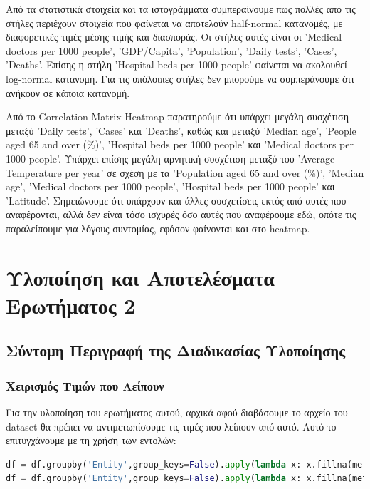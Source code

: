 \documentclass[12pt,a4paper]{article}
\begin{document}
Από τα στατιστικά στοιχεία και τα ιστογράμματα συμπεραίνουμε πως πολλές από τις στήλες περιέχουν στοιχεία που φαίνεται να αποτελούν half-normal κατανομές, με διαφορετικές τιμές μέσης τιμής και διασποράς. Οι στήλες αυτές είναι οι 'Medical doctors per 1000 people', 'GDP/Capita', 'Population', 'Daily tests', 'Cases', 'Deaths'. Επίσης η στήλη 'Hospital beds per 1000 people' φαίνεται να ακολουθεί log-normal κατανομή. Για τις υπόλοιπες στήλες δεν μπορούμε να συμπεράνουμε ότι ανήκουν σε κάποια κατανομή.

Από το Correlation Matrix Heatmap παρατηρούμε ότι υπάρχει μεγάλη συσχέτιση μεταξύ 'Daily tests', 'Cases' και 'Deaths', καθώς και μεταξύ 'Median age', 'People aged 65 and over (\%)', 'Hospital beds per 1000 people' και 'Medical doctors per 1000 people'. Υπάρχει επίσης μεγάλη αρνητική συσχέτιση μεταξύ του 'Average Temperature per year' σε σχέση με τα 'Population aged 65 and over (\%)', 'Median age', 'Medical doctors per 1000 people', 'Hospital beds per 1000 people' και 'Latitude'. Σημειώνουμε ότι υπάρχουν και άλλες συσχετίσεις εκτός από αυτές που αναφέρονται, αλλά δεν είναι τόσο ισχυρές όσο αυτές που αναφέρουμε εδώ, οπότε τις παραλείπουμε για λόγους συντομίας, εφόσον φαίνονται και στο heatmap.

\section{Υλοποίηση και Αποτελέσματα Ερωτήματος 2}

\subsection{Σύντομη Περιγραφή της Διαδικασίας Υλοποίησης}

\subsubsection{Χειρισμός Τιμών που Λείπουν}

Για την υλοποίηση του ερωτήματος αυτού, αρχικά αφού διαβάσουμε το αρχείο του dataset θα πρέπει να αντιμετωπίσουμε τις τιμές που λείπουν από αυτό. Αυτό το επιτυγχάνουμε με τη χρήση των εντολών:

\begin{lstlisting}[language=Python]
df = df.groupby('Entity',group_keys=False).apply(lambda x: x.fillna(method='ffill'))
df = df.groupby('Entity',group_keys=False).apply(lambda x: x.fillna(method='bfill'))
\end{lstlisting}
\end{document}
